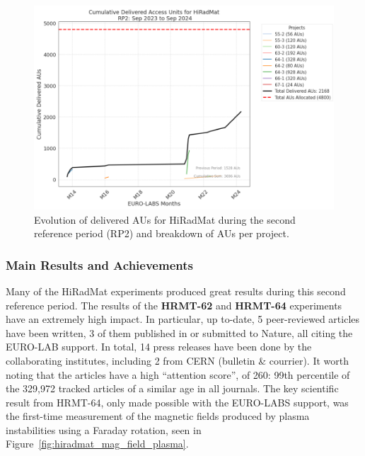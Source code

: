 \begin{figure}[!h]
    \centering
    \includegraphics[width=0.9\linewidth]{graphics/RP2_evolution_hiradmat.png}
    \caption{Evolution of delivered AUs for HiRadMat during the second reference period (RP2) and breakdown of AUs per project.}
    \label{fig:RP2_evolution_hiradmat}
\end{figure}

\subsubsection*{Main Results and Achievements}

Many of the HiRadMat experiments produced great results during this second reference period. The results of the \textbf{HRMT-62} and \textbf{HRMT-64} experiments have an extremely high impact. In particular, up to-date, 5 peer-reviewed articles have been written, 3 of them published in or submitted to Nature, all citing the EURO-LAB support. In total, 14 press releases have been done by the collaborating institutes, including 2 from CERN (bulletin \& courrier). It worth noting that the articles have a high ``attention score'', of 260: 99th percentile of the 329,972 tracked articles of a similar age in all journals. The key scientific result from HRMT-64, only made possible with the EURO-LABS support, was the first-time measurement of the magnetic fields produced by plasma instabilities using a Faraday rotation, seen in Figure~\ref{fig:hiradmat_mag_field_plasma}.


